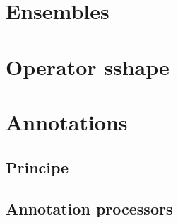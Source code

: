 \documentclass{report}
\begin{document}
\chapter{Ensembles}

\chapter{Operator sshape}

\chapter{Annotations}

\section{Principe}

\section{Annotation processors}
\end{document}
